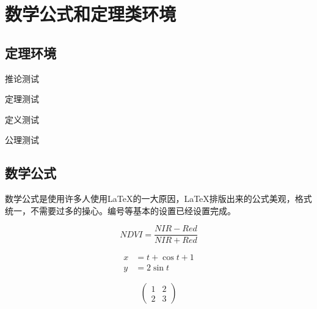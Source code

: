 
\chapter{数学公式和定理类环境}

\section{定理环境}

\begin{corollary}\label{cor1}
推论测试
\end{corollary}


\begin{theorem}\label{thm1}
定理测试
\end{theorem}

\begin{definition}\label{def1}
定义测试
\end{definition}

\begin{axiom}\label{axi1}
公理测试
\end{axiom}



\section{数学公式}

\par 数学公式是使用许多人使用\LaTeX 的一大原因，\LaTeX 排版出来的公式美观，格式统一，不需要过多的操心。编号等基本的设置已经设置完成。


\begin{equation}
	NDVI  =  \frac{NIR-Red}{NIR+Red}	
\end{equation}


\begin{align} 
	 x   &   =  t  + \cos t + 1 \\
	 y   &  = 2 \sin t
\end{align}


\[ \begin{pmatrix}
        1    &         2\\ 
        2    &         3  
\end{pmatrix}			\label{matrix}  
\]





